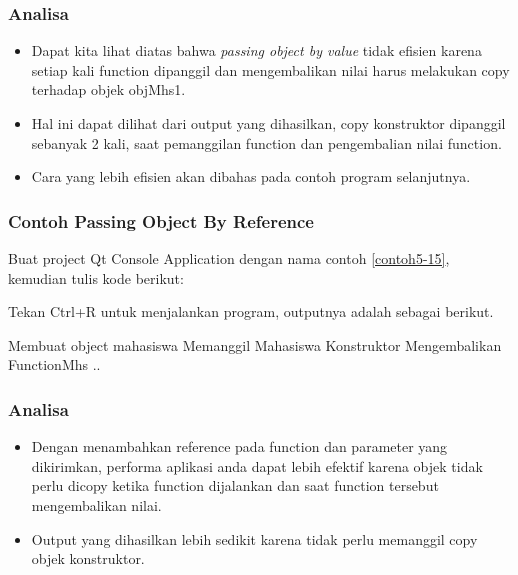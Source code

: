 \subsubsection*{Analisa}

\begin{itemize}

\item
  Dapat kita lihat diatas bahwa \emph{passing object by value} tidak
  efisien karena setiap kali function dipanggil dan mengembalikan nilai
  harus melakukan copy terhadap objek objMhs1.
\item
  Hal ini dapat dilihat dari output yang dihasilkan, copy konstruktor
  dipanggil sebanyak 2 kali, saat pemanggilan function dan pengembalian
  nilai function.
\item
  Cara yang lebih efisien akan dibahas pada contoh program selanjutnya.
\end{itemize}

\subsubsection*{Contoh  Passing Object By Reference}

Buat project Qt Console Application dengan nama contoh \ref{contoh5-15}, kemudian
tulis kode berikut:



Tekan Ctrl+R untuk menjalankan program, outputnya adalah sebagai
berikut.

\begin{lcverbatim}
Membuat object mahasiswa
Memanggil Mahasiswa Konstruktor
Mengembalikan FunctionMhs ..
\end{lcverbatim}

\subsubsection*{Analisa}

\begin{itemize}

\item
  Dengan menambahkan reference pada function dan parameter yang
  dikirimkan, performa aplikasi anda dapat lebih efektif karena objek
  tidak perlu dicopy ketika function dijalankan dan saat function
  tersebut mengembalikan nilai.
\item
  Output yang dihasilkan lebih sedikit karena tidak perlu memanggil copy
  objek konstruktor.
\end{itemize}
